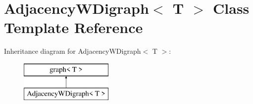 \hypertarget{classAdjacencyWDigraph}{}\section{Adjacency\+W\+Digraph$<$ T $>$ Class Template Reference}
\label{classAdjacencyWDigraph}
Inheritance diagram for Adjacency\+W\+Digraph$<$ T $>$\+:\begin{figure}[H]
\begin{center}
\leavevmode
\includegraphics[height=2.000000cm]{classAdjacencyWDigraph}
\end{center}
\end{figure}
